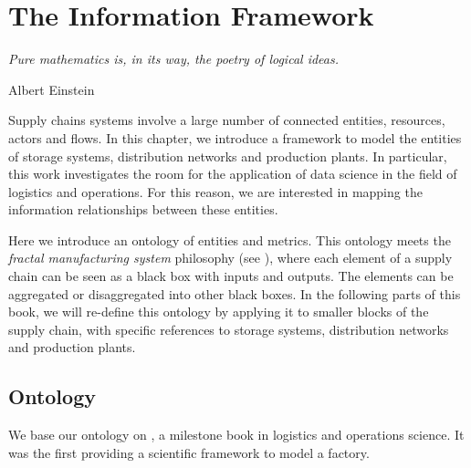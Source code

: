 \chapter{The Information Framework} \label{chap_InformationFramework}

\epigraph{\textit{Pure mathematics is, in its way, the poetry of logical ideas.}}{Albert Einstein}


Supply chains systems involve a large number of connected entities, resources, actors and flows.  In this chapter, we introduce a framework to model the entities of storage systems, distribution networks and production plants. In particular, this work investigates the room for the application of data science in the field of logistics and operations. For this reason, we are interested in mapping the information relationships between these entities.\par

Here we introduce an ontology of entities and metrics. This ontology meets the \textit{fractal manufacturing system} philosophy (see \cite{Sprock2018}), where each element of a supply chain can be seen as a black box with inputs and outputs. The elements can be aggregated or disaggregated into other black boxes. In the following parts of this book, we will re-define this ontology by applying it to smaller blocks of the supply chain, with specific references to storage systems, distribution networks and production plants.

\section{Ontology}\label{secOntology}
We base our ontology on \cite{Hopp2011}, a milestone book in logistics and operations science. It was the first providing a scientific framework to model a factory. 

